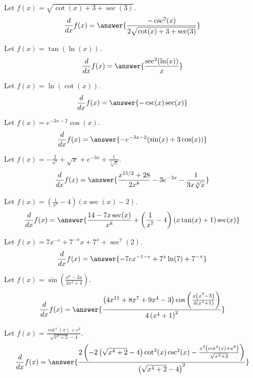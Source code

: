 \documentclass{ximera}
\begin{document}
\begin{shuffle}
\begin{exercise}
Let $f(x)=\sqrt{\cot (x)+3+\sec (3)}$.
\[
\ddx f(x) = \answer{\frac{-\csc ^2(x)}{2 \sqrt{\cot (x)+3+\sec (3)}}}
\]
\end{exercise}

\begin{exercise}
Let $f(x)=\tan (\ln (x))$.
\[
\ddx f(x) = \answer{\frac{\sec ^2(\ln (x))}{x}}
\]
\end{exercise}

\begin{exercise}
Let $f(x)=\ln (\cot (x))$.
\[
\ddx f(x) = \answer{-\csc (x) \sec (x)}
\]
\end{exercise}

\begin{exercise}
Let $f(x)=e^{-3 x-2} \cos (x)$.
\[
\ddx f(x) = \answer{-e^{-3 x-2} (\sin (x)+3 \cos (x))}
\]
\end{exercise}

\begin{exercise}
Let $f(x)=-\frac{2}{x^7}+\sqrt{x}+e^{-3 x}+\frac{1}{\sqrt[3]{x}}$.
\[
\ddx f(x) = \answer{\frac{x^{15/2}+28}{2 x^8}-3 e^{-3 x}-\frac{1}{3 x \sqrt[3]{x}}}
\]
\end{exercise}

\begin{exercise}
Let $f(x)=\left(\frac{1}{x^7}-4\right) (x \sec (x)-2)$.
\[
\ddx f(x) = \answer{\frac{14-7 x \sec (x)}{x^8}+\left(\frac{1}{x^7}-4\right) (x \tan (x)+1) \sec (x)}
\]
\end{exercise}

\begin{exercise}
Let $f(x)=7 x^{-e}+7^{-\pi } x+7^x+\sec ^7(2)$.
\[
\ddx f(x) = \answer{-7 e x^{-1-e}+7^x \ln (7)+7^{-\pi }}
\]
\end{exercise}

\begin{exercise}
Let $f(x)=\sin \left(\frac{x^8-3 x}{4 x^4+4}\right)$.
\[
\ddx f(x) = \answer{\frac{\left(4 x^{11}+8 x^7+9 x^4-3\right) \cos \left(\frac{x \left(x^7-3\right)}{4 \left(x^4+1\right)}\right)}{4 \left(x^4+1\right)^2}}
\]
\end{exercise}

\begin{exercise}
Let $f(x)=\frac{\cot ^4(x)+e^2}{\sqrt{x^4+2}-4}$.
\[
\ddx f(x) = \answer{\frac{2 \left(-2 \left(\sqrt{x^4+2}-4\right) \cot ^3(x) \csc ^2(x)-\frac{x^3 \left(\cot ^4(x)+e^2\right)}{\sqrt{x^4+2}}\right)}{\left(\sqrt{x^4+2}-4\right)^2}}
\]
\end{exercise}


\end{shuffle}
\end{document}
